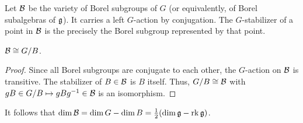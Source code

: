 Let $\mathcal{B}$ be the variety of Borel subgroups of $G$ (or equivalently, of Borel subalgebras of $\mathfrak{g}$). It carries a left $G$-action by conjugation. The $G$-stabilizer of a point in $\mathcal{B}$ is the precisely the Borel subgroup represented by that point.
\begin{lemma}[lem:]{}
    $\mathcal{B} \cong G/B$.
    \begin{proof}
        Since all Borel subgroups are conjugate to each other, the $G$-action on $\mathcal{B}$ is transitive. The stabilizer of $B \in \mathcal{B}$ is $B$ itself. Thus, $G/B \cong \mathcal{B}$ with $gB \in G/B \mapsto gBg^{-1} \in \mathcal{B}$ is an isomorphism.
    \end{proof}
\end{lemma}
It follows that $\dim \mathcal{B} = \dim G - \dim B = \frac{1}{2}(\dim \mathfrak{g} - \operatorname{rk} \mathfrak{g})$.

